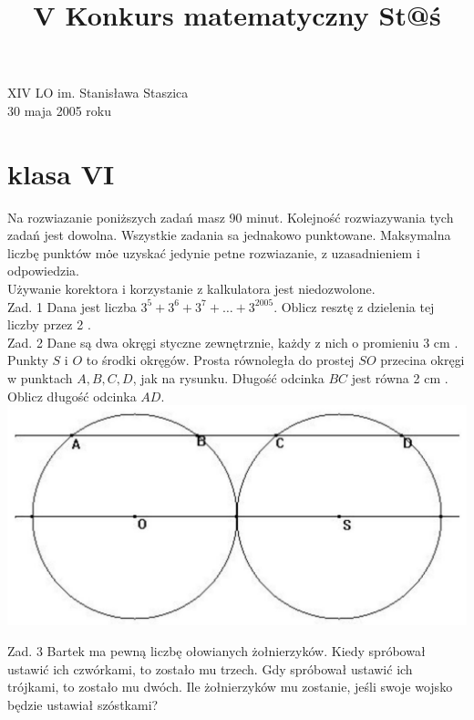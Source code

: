 \documentclass[10pt]{article}
\title{V Konkurs matematyczny St@ś }
\author{}
\date{}
\begin{document}
\maketitle
XIV LO im. Stanisława Staszica\\
30 maja 2005 roku

\section*{klasa VI}
Na rozwiazanie poniższych zadań masz 90 minut. Kolejność rozwiazywania tych zadań jest dowolna. Wszystkie zadania sa jednakowo punktowane. Maksymalna liczbę punktów mȯ̇e uzyskać jedynie petne rozwiazanie, z uzasadnieniem i odpowiedzia.\\
Używanie korektora i korzystanie z kalkulatora jest niedozwolone.\\
Zad. 1 Dana jest liczba \(3^{5}+3^{6}+3^{7}+\ldots+3^{2005}\). Oblicz resztę z dzielenia tej liczby przez 2 .\\
Zad. 2 Dane są dwa okręgi styczne zewnętrznie, każdy z nich o promieniu 3 cm . Punkty \(S\) i \(O\) to środki okręgów. Prosta równoległa do prostej \(S O\) przecina okręgi w punktach \(A, B, C, D\), jak na rysunku. Długość odcinka \(B C\) jest równa 2 cm . Oblicz długość odcinka \(A D\).\\
\includegraphics[max width=\textwidth, center]{2024_11_21_2558362c2bd32ec13884g-1(1)}

Zad. 3 Bartek ma pewną liczbę ołowianych żołnierzyków. Kiedy spróbował ustawić ich czwórkami, to zostało mu trzech. Gdy spróbował ustawić ich trójkami, to zostało mu dwóch. Ile żołnierzyków mu zostanie, jeśli swoje wojsko będzie ustawiał szóstkami?
\end{document}
